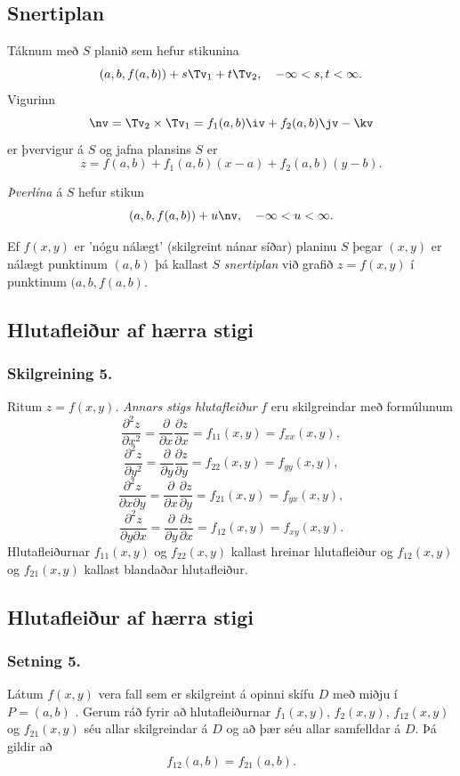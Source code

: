 \subsection{Snertiplan}
 Táknum með $S$ planið sem hefur stikunina
$$(a,b,f(a,b))+s\Tv_1+t\Tv_2, \quad -\infty < s,t < \infty.$$
Vigurinn 
$$\nv=\Tv_2\times \Tv_1=f_1(a,b)\iv+f_2(a,b)\jv-\kv$$
er þvervigur á $S$ og jafna plansins $S$ er
$$z=f(a,b)+f_1(a,b)(x-a)+f_2(a,b)(y-b).$$

\emph{Þverlína} á $S$ hefur stikun
$$(a,b,f(a,b)) + u \nv, \quad -\infty < u < \infty.$$

Ef $f(x,y)$ er 'nógu nálægt' (skilgreint nánar síðar) planinu $S$ þegar $(x,y)$ er nálægt punktinum $(a,b)$ þá kallast $S$ \emph{snertiplan} við grafið $z=f(x,y)$ í punktinum $(a,b,f(a,b)$.


\subsection{Hlutafleiður af hærra stigi}
 \subsubsection{Skilgreining 5.}
  Ritum $z=f(x,y)$.  {\em Annars stigs
  hlutafleiður} $f$ eru skilgreindar með formúlunum
$$\frac{\partial^2 z}{\partial x^2}=
\frac{\partial}{\partial x} \frac{\partial z}{\partial x}
=f_{11}(x,y)=f_{xx}(x,y),$$
$$\frac{\partial^2 z}{\partial y^2}=
\frac{\partial}{\partial y} \frac{\partial z}{\partial y}
=f_{22}(x,y)=f_{yy}(x,y),$$
$$\frac{\partial^2 z}{\partial x\partial y}=
\frac{\partial}{\partial x} \frac{\partial z}{\partial y}
=f_{21}(x,y)=f_{yx}(x,y),$$
$$\frac{\partial^2 z}{\partial y\partial x}=
\frac{\partial}{\partial y} \frac{\partial z}{\partial x}
=f_{12}(x,y)=f_{xy}(x,y).$$
Hlutafleiðurnar $f_{11}(x,y)$ og $f_{22}(x,y)$ kallast hreinar
hlutafleiður og $f_{12}(x,y)$ og $f_{21}(x,y)$ kallast blandaðar
hlutafleiður.  
 



\subsection{Hlutafleiður af hærra stigi}
 \subsubsection{Setning 5.}
  Látum $f(x,y)$ vera fall sem er skilgreint á opinni
skífu $D$ með miðju í $P=(a,b)$ .  Gerum ráð fyrir að
hlutafleiðurnar $f_1(x,y)$, $f_2(x,y)$, $f_{12}(x,y)$ og $f_{21}(x,y)$
séu allar skilgreindar á $D$ og að þær séu allar samfelldar á $D$.  Þá
gildir að 
$$f_{12}(a,b)=f_{21}(a,b).$$
 



